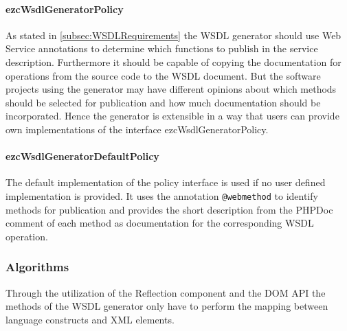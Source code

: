 \documentclass[10pt,final,a4paper,oneside]{article}
\begin{document}
\paragraph{ezcWsdlGeneratorPolicy}
As stated in \ref{subsec:WSDLRequirements}
the WSDL generator should
use Web Service annotations
to determine which functions to publish
in the service description.
Furthermore it should be capable of
copying the documentation for operations
from the source code to the WSDL document.
But the software projects using the generator
may have different opinions about
which methods should be selected for publication
and how much documentation should be incorporated.
Hence the generator is extensible in a way
that users can provide own implementations of the
interface ezcWsdlGeneratorPolicy.

\paragraph{ezcWsdlGeneratorDefaultPolicy}
The default implementation of the policy interface
is used if no user defined implementation is provided.
It uses the annotation \verb|@webmethod|
to identify methods for publication and
provides the short description from the PHPDoc comment
of each method as documentation for
the corresponding WSDL operation.




\subsubsection{Algorithms}
Through the utilization of the Reflection component
and the DOM API the methods of the WSDL generator
only have to perform the mapping between
language constructs and XML elements.
\end{document}
